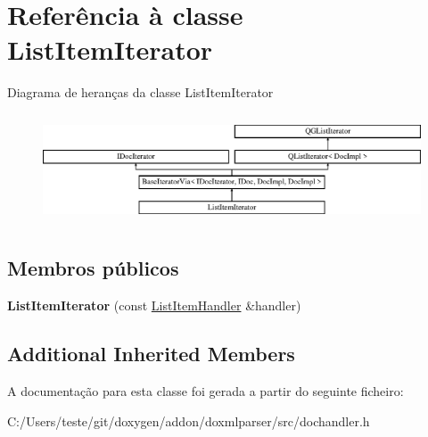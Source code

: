 \hypertarget{class_list_item_iterator}{\section{Referência à classe List\-Item\-Iterator}
\label{class_list_item_iterator}
}
Diagrama de heranças da classe List\-Item\-Iterator\begin{figure}[H]
\begin{center}
\leavevmode
\includegraphics[height=3.294118cm]{class_list_item_iterator}
\end{center}
\end{figure}
\subsection*{Membros públicos}
\begin{DoxyCompactItemize}
\item 
\hypertarget{class_list_item_iterator_a73121dff278c5da0d7b9ce1a99f7fe64}{{\bfseries List\-Item\-Iterator} (const \hyperlink{class_list_item_handler}{List\-Item\-Handler} \&handler)}\label{class_list_item_iterator_a73121dff278c5da0d7b9ce1a99f7fe64}

\end{DoxyCompactItemize}
\subsection*{Additional Inherited Members}


A documentação para esta classe foi gerada a partir do seguinte ficheiro\-:\begin{DoxyCompactItemize}
\item 
C\-:/\-Users/teste/git/doxygen/addon/doxmlparser/src/dochandler.\-h\end{DoxyCompactItemize}
